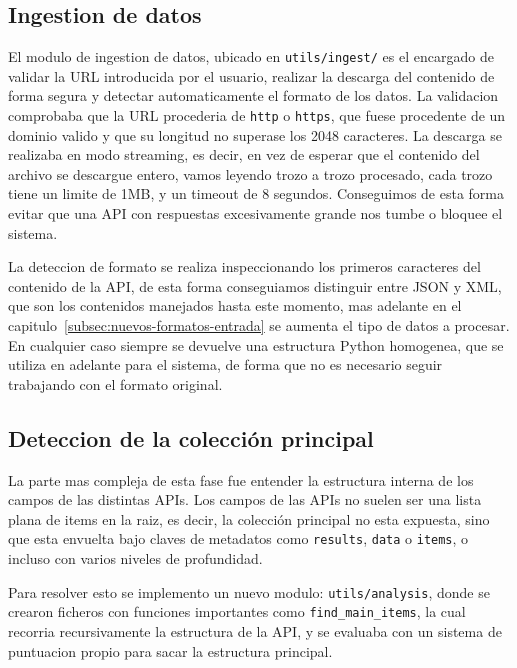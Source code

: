 \subsection{Ingestion de datos}
\label{subsec:ingestion-datos}

El modulo de ingestion de datos, ubicado en \texttt{utils/ingest/} es el encargado de validar la URL introducida por el usuario, realizar la descarga del contenido
de forma segura y detectar automaticamente el formato de los datos. La validacion comprobaba que la URL procederia de \texttt{http} o \texttt{https}, que fuese
procedente de un dominio valido y que su longitud no superase los 2048 caracteres. La descarga se realizaba en modo streaming, es decir, en vez de esperar que
el contenido del archivo se descargue entero, vamos leyendo trozo a trozo procesado, cada trozo tiene un limite de 1MB, y un timeout de 8 segundos. Conseguimos de 
esta forma evitar que una API con respuestas excesivamente grande nos tumbe o bloquee el sistema.

La deteccion de formato se realiza inspeccionando los primeros caracteres del contenido de la API, de esta forma conseguiamos distinguir entre JSON y XML, que son 
los contenidos manejados hasta este momento, mas adelante en el capitulo~\ref{subsec:nuevos-formatos-entrada} se aumenta el tipo de datos a procesar. En cualquier caso 
siempre se devuelve una estructura Python homogenea, que se utiliza en adelante para el sistema, de forma que no es necesario seguir trabajando con el formato 
original.

\subsection{Deteccion de la colección principal}
\label{subsection:deteccion-coleccion-principal}

La parte mas compleja de esta fase fue entender la estructura interna de los campos de las distintas APIs. Los campos de las APIs no suelen ser una lista plana de items
en la raiz, es decir, la colección principal no esta expuesta, sino que esta envuelta bajo claves de metadatos como \texttt{results}, \texttt{data} o \texttt{items},
o incluso con varios niveles de profundidad. 

Para resolver esto se implemento un nuevo modulo: \texttt{utils/analysis}, donde se crearon ficheros con funciones importantes como \texttt{find\_main\_items}, la cual recorria recursivamente la estructura de la API, y se evaluaba con un sistema de puntuacion propio para sacar la estructura principal.

